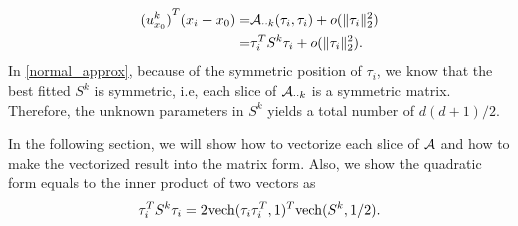 \documentclass{article}
\theoremstyle{remark}
\begin{document}
\begin{equation}\label{normal_approx}
\begin{aligned}
 {(u^k_{x_0})}^T (x_i -x_0) 
=&{\cal A}_{\cdot\cdot k}(\tau_i,\tau_i) +  o(\|\tau_i\|_2^2)\\
=&\tau_i^T S^{k}\tau_i + o(\|\tau_i\|_2^2).
\end{aligned}
\end{equation}
In \eqref{normal_approx}, because of the symmetric position of $\tau_i$, we know that the best fitted $S^k$ is symmetric, i.e, each slice of ${\cal A}_{\cdot\cdot k}$ is a symmetric matrix. Therefore, the unknown parameters in $S^k$ yields a total number of ${d(d+1)}/{2}$. 


In the following section, we will show how to vectorize each slice of $\cal A$ and  how to make the vectorized result into the matrix form. Also, we show the quadratic form equals to the inner product of two vectors as
\[
\tau_i^T S^{k}\tau_i  = 2{\rm vech}(\tau_i\tau_i^T,1)^T {\rm vech}(S^k,1/2).
\]
\end{document}
